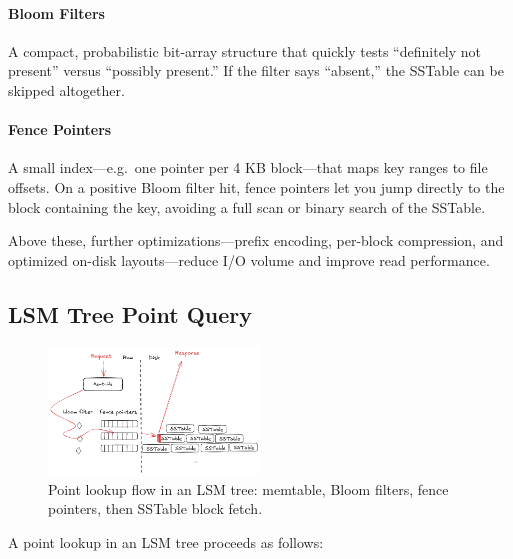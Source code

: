 \documentclass[sigconf]{acmart}
\begin{document}
      \paragraph{Bloom Filters}
      A compact, probabilistic bit-array structure that quickly tests “definitely not present” versus “possibly present.”  If the filter says “absent,” the SSTable can be skipped altogether.

      \paragraph{Fence Pointers}
      A small index—e.g.\ one pointer per 4 KB block—that maps key ranges to file offsets.  On a positive Bloom filter hit, fence pointers let you jump directly to the block containing the key, avoiding a full scan or binary search of the SSTable.

      Above these, further optimizations—prefix encoding, per-block compression, and optimized on-disk layouts—reduce I/O volume and improve read performance.

      \subsection{LSM Tree Point Query}
        \label{sec:readpath}

      \begin{figure}[h]
        \centering
        \includegraphics[width=0.5\textwidth,height=0.3\textheight]{read path.png}
        \caption{Point lookup flow in an LSM tree: memtable, Bloom filters, fence pointers, then SSTable block fetch.}
        \label{fig:readpath}
      \end{figure}

      A point lookup in an LSM tree proceeds as follows:
\end{document}
